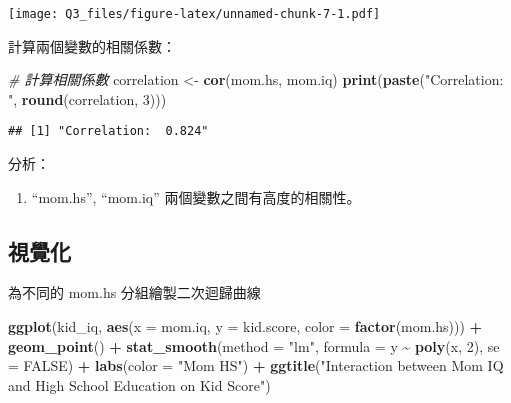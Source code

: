 \documentclass[
]{article}
\newenvironment{Shaded}{\begin{snugshade}}{\end{snugshade}}
\newcommand{\AttributeTok}[1]{\textcolor[rgb]{0.13,0.29,0.53}{#1}}
\newcommand{\CommentTok}[1]{\textcolor[rgb]{0.56,0.35,0.01}{\textit{#1}}}
\newcommand{\ConstantTok}[1]{\textcolor[rgb]{0.56,0.35,0.01}{#1}}
\newcommand{\DecValTok}[1]{\textcolor[rgb]{0.00,0.00,0.81}{#1}}
\newcommand{\FunctionTok}[1]{\textcolor[rgb]{0.13,0.29,0.53}{\textbf{#1}}}
\newcommand{\NormalTok}[1]{#1}
\newcommand{\OtherTok}[1]{\textcolor[rgb]{0.56,0.35,0.01}{#1}}
\newcommand{\SpecialCharTok}[1]{\textcolor[rgb]{0.81,0.36,0.00}{\textbf{#1}}}
\newcommand{\StringTok}[1]{\textcolor[rgb]{0.31,0.60,0.02}{#1}}
\providecommand{\tightlist}{%
  \setlength{\itemsep}{0pt}\setlength{\parskip}{0pt}}
\begin{document}
\texttt{[image: Q3\_files/figure-latex/unnamed-chunk-7-1.pdf]}

計算兩個變數的相關係數：

\begin{Shaded}
\begin{Highlighting}[]
\CommentTok{\# 計算相關係數}
\NormalTok{correlation }\OtherTok{\textless{}{-}} \FunctionTok{cor}\NormalTok{(mom.hs, mom.iq)}
\FunctionTok{print}\NormalTok{(}\FunctionTok{paste}\NormalTok{(}\StringTok{"Correlation: "}\NormalTok{, }\FunctionTok{round}\NormalTok{(correlation, }\DecValTok{3}\NormalTok{)))}
\end{Highlighting}
\end{Shaded}

\begin{verbatim}
## [1] "Correlation:  0.824"
\end{verbatim}

分析：

\begin{enumerate}
\def\labelenumi{\arabic{enumi}.}
\tightlist
\item
  ``mom.hs'', ``mom.iq'' 兩個變數之間有高度的相關性。
\end{enumerate}

\subsection{視覺化}\label{ux8996ux89baux5316-1}

為不同的 mom.hs 分組繪製二次迴歸曲線

\begin{Shaded}
\begin{Highlighting}[]
\FunctionTok{ggplot}\NormalTok{(kid\_iq, }\FunctionTok{aes}\NormalTok{(}\AttributeTok{x =}\NormalTok{ mom.iq, }\AttributeTok{y =}\NormalTok{ kid.score, }\AttributeTok{color =} \FunctionTok{factor}\NormalTok{(mom.hs))) }\SpecialCharTok{+} 
  \FunctionTok{geom\_point}\NormalTok{() }\SpecialCharTok{+}
  \FunctionTok{stat\_smooth}\NormalTok{(}\AttributeTok{method =} \StringTok{"lm"}\NormalTok{, }\AttributeTok{formula =}\NormalTok{ y }\SpecialCharTok{\textasciitilde{}} \FunctionTok{poly}\NormalTok{(x, }\DecValTok{2}\NormalTok{), }\AttributeTok{se =} \ConstantTok{FALSE}\NormalTok{) }\SpecialCharTok{+}
  \FunctionTok{labs}\NormalTok{(}\AttributeTok{color =} \StringTok{"Mom HS"}\NormalTok{) }\SpecialCharTok{+}
  \FunctionTok{ggtitle}\NormalTok{(}\StringTok{"Interaction between Mom IQ and High School Education on Kid Score"}\NormalTok{)}
\end{Highlighting}
\end{Shaded}
\end{document}
